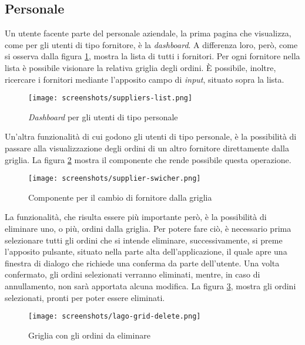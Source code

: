 \subsection{Personale}
Un utente facente parte del personale aziendale, la prima pagina che visualizza, come per gli utenti di tipo fornitore, è la \emph{dashboard}.
A differenza loro, però, come si osserva dalla figura \ref{fig:lago-dashboard}, mostra la lista di tutti i fornitori.
Per ogni fornitore nella lista è possibile visionare la relativa griglia degli ordini.
È possibile, inoltre, ricercare i fornitori mediante l'apposito campo di \emph{input}, situato sopra la lista.

\begin{figure}[!ht]
  \begin{center}
    \texttt{[image: screenshots/suppliers-list.png]}
    \caption{\emph{Dashboard} per gli utenti di tipo personale}
    \label{fig:lago-dashboard}
  \end{center}
\end{figure}
\newpage
Un'altra funzionalità di cui godono gli utenti di tipo personale, è la possibilità di passare alla visualizzazione degli ordini di un altro fornitore direttamente dalla griglia.
La figura \ref{fig:supplier-swicher} mostra il componente che rende possibile questa operazione.

\begin{figure}[!ht]
  \begin{center}
    \texttt{[image: screenshots/supplier-swicher.png]}
    \caption{Componente per il cambio di fornitore dalla griglia}
    \label{fig:supplier-swicher}
  \end{center}
\end{figure}

La funzionalità, che risulta essere più importante però, è la possibilità di eliminare uno, o più, ordini dalla griglia.
Per potere fare ciò, è necessario prima selezionare tutti gli ordini che si intende eliminare, successivamente, si preme l'apposito pulsante, situato nella parte alta dell'applicazione, il quale apre una finestra di dialogo che richiede una conferma da parte dell'utente.
Una volta confermato, gli ordini selezionati verranno eliminati, mentre, in caso di annullamento, non sarà apportata alcuna modifica.
La figura \ref{fig:lago-grid-delete}, mostra gli ordini selezionati, pronti per poter essere eliminati.

\begin{figure}[!ht]
  \begin{center}
    \texttt{[image: screenshots/lago-grid-delete.png]}
    \caption{Griglia con gli ordini da eliminare}
    \label{fig:lago-grid-delete}
  \end{center}
\end{figure}

